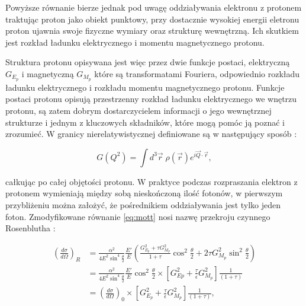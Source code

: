 \documentclass[11pt]{book}
\theoremstyle{definition}
\begin{document}


Powyższe równanie bierze jednak pod uwagę oddziaływania elektronu z protonem traktując proton jako obiekt punktowy, przy dostacznie wysokiej energii eletronu proton ujawnia swoje fizyczne wymiary oraz strukturę wewnętrzną. Ich skutkiem jest rozkład ładunku elektrycznego i momentu magnetycznego protonu. 


Struktura protonu opisywana jest więc przez dwie funkcje postaci, elektryczną $G_{E_p}$ i magnetyczną $G_{M_p}$ które są transformatami Fouriera, odpowiednio rozkładu ładunku elektrycznego i rozkładu momentu magnetycznego protonu.  Funkcje postaci protonu opisują przestrzenny rozkład ładunku elektrycznego we wnętrzu protonu, są zatem dobrym dostarczycielem informacji o jego wewnętrznej strukturze i jednym z kluczowych składników, które mogą pomóc ją poznać i zrozumieć. W granicy nierelatywistycznej definiowane są w następujący sposób \cite{Carlson:2015jba}:

\begin{equation}
G(Q^2) = \int d^3 \vec{r} \; \rho(\vec{r}) e^{i\vec{Q}\cdot \vec{r}} , \label{eq:formfactor}
\end{equation}

całkując po całej objętości protonu. W praktyce podczas rozpraszania elektron z protonem wymieniają między sobą nieskończoną ilość fotonów, w pierwszym przybliżeniu można założyć, że pośrednikiem oddziaływania jest tylko jeden foton. Zmodyfikowane równanie \ref{eq:mott} nosi nazwę przekroju czynnego Rosenblutha \cite{1990..Taylor}:

\begin{equation}
\begin{split}
\left( \frac{d\sigma}{d\Omega} \right)_R  &= \frac{\alpha^2 }{4E^2\sin^4 \frac{\theta}{2}} \frac{E'}{E} \left(\frac{G_{E_p}^2 + \tau G_{M_p}^2}{1+\tau} \cos^2 \frac{\theta}{2} + 2\tau G_{M_p}^2\sin^2\frac{\theta}{2}\right) \\
&=  \frac{\alpha^2 }{4E^2\sin^4 \frac{\theta}{2}} \frac{E'}{E}  \cos^2 \frac{\theta}{2} \times \left[ G_{Ep}^2 + \frac{\tau}{\epsilon} G_{M_p}^2 \right] \frac{1}{\left(1 + \tau\right)} \\
&= \left( \frac{d\sigma}{d\Omega} \right)_0 \times \left[ G_{E_p}^2 + \frac{\tau}{\epsilon} G_{M_p}^2 \right] \frac{1}{\left(1 + \tau\right)},
\end{split}
\end{equation}
\end{document}
